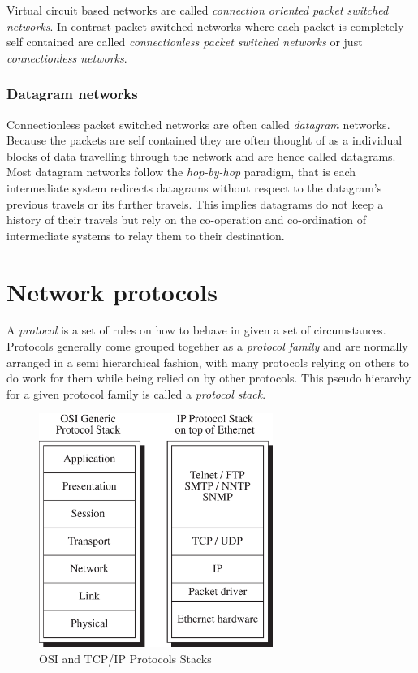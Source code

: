 Virtual circuit based networks are called {\em connection oriented
packet switched networks}.  In contrast packet switched networks where
each packet is completely self contained are called {\em
connectionless packet switched networks} or just {\em connectionless
networks}.

\subsubsection{Datagram networks}

Connectionless packet switched networks are often called {\em
datagram} networks.  Because the packets are self contained they are
often thought of as a individual blocks of data travelling through
the network and are hence called datagrams.  Most datagram networks
follow the {\em hop-by-hop} paradigm, that is each intermediate system
redirects datagrams without respect to the datagram's previous travels
or its further travels.  This implies datagrams do not keep a history
of their travels but rely on the co-operation and co-ordination of
intermediate systems to relay them to their destination.

\section{Network protocols}

A {\em protocol} is a set of rules on how to behave in given a set of
circumstances.  Protocols generally come grouped together as a {\em
protocol family} and are normally arranged in a semi hierarchical
fashion, with many protocols relying on others to do work for them
while being relied on by other protocols.  This pseudo hierarchy for a
given protocol family is called a {\em protocol stack}.

\begin{figure}
\begin{center}
\includegraphics[height=3in]{pics/pstack.eps}
\end{center}
\caption{OSI and TCP/IP Protocols Stacks}
\label{network:pstack}
\end{figure}

